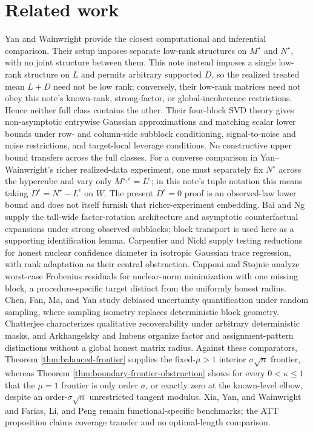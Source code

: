 \documentclass{article}
\begin{document}
\section{Related work}

Yan and Wainwright provide the closest computational and inferential comparison. Their setup imposes separate low-rank structures on \(M^\star\) and \(N^\star\), with no joint structure between them. This note instead imposes a single low-rank structure on \(L\) and permits arbitrary supported \(D\), so the realized treated mean \(L+D\) need not be low rank; conversely, their low-rank matrices need not obey this note's known-rank, strong-factor, or global-incoherence restrictions. Hence neither full class contains the other. Their four-block SVD theory gives non-asymptotic entrywise Gaussian approximations and matching scalar lower bounds under row- and column-side subblock conditioning, signal-to-noise and noise restrictions, and target-local leverage conditions. No constructive upper bound transfers across the full classes. For a converse comparison in Yan--Wainwright's richer realized-data experiment, one must separately fix \(N^\star\) across the hypercube and vary only \(M^{\star,\epsilon}=L^\epsilon\); in this note's tuple notation this means taking \(D^\epsilon=N^\star-L^\epsilon\) on \(W\). The present \(D^\epsilon=0\) proof is an observed-law lower bound and does not itself furnish that richer-experiment embedding. Bai and Ng supply the tall-wide factor-rotation architecture and asymptotic counterfactual expansions under strong observed subblocks; block transport is used here as a supporting identification lemma. Carpentier and Nickl supply testing reductions for honest nuclear confidence diameter in isotropic Gaussian trace regression, with rank adaptation as their central obstruction. Capponi and Stojnic analyze worst-case Frobenius residuals for nuclear-norm minimization with one missing block, a procedure-specific target distinct from the uniformly honest radius. Chen, Fan, Ma, and Yan study debiased uncertainty quantification under random sampling, where sampling isometry replaces deterministic block geometry. Chatterjee characterizes qualitative recoverability under arbitrary deterministic masks, and Arkhangelsky and Imbens organize factor and assignment-pattern distinctions without a global honest matrix radius. Against these comparators, Theorem \ref{thm:balanced-frontier} supplies the fixed-\(\mu>1\) interior \(\sigma\sqrt n\) frontier, whereas Theorem \ref{thm:boundary-frontier-obstruction} shows for every \(0<\kappa\le1\) that the \(\mu=1\) frontier is only order \(\sigma\), or exactly zero at the known-level elbow, despite an order-\(\sigma\sqrt n\) unrestricted tangent modulus. Xia, Yan, and Wainwright and Farias, Li, and Peng remain functional-specific benchmarks; the ATT proposition claims coverage transfer and no optimal-length comparison.
\end{document}
